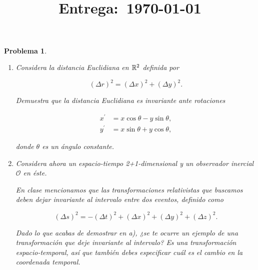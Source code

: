 \documentclass[12pt]{article}
\title{
    \textbf{\homeworknumber}\\
    \normalsize\vspace{0.1in}\small{\textbf{Entrega}:~\today}
    \vspace{-1.5in}
}
\author{}
\date{}
\theoremstyle{break}
\newtheorem{exercise}{Problema}
\theoremstyle{nonumberbreak}
\newcommand*{\observer}{\mathcal{O}}
\begin{document}
    \maketitle
    \thispagestyle{fancy}
    
    \begin{exercise}
        \begin{enumerate}[label = \alph*)]
            \item Considera la distancia Euclidiana en \(\vecspace{R}[2]\) definida por
            
                \begin{equation*}
                    (\Delta r)^{2} = (\Delta x)^{2} + (\Delta y)^{2}.
                \end{equation*}

                Demuestra que la distancia Euclidiana es invariante ante rotaciones

                \begin{align*}
                    x^{\prime} &= x\cos\theta - y\sin\theta,\\
                    y^{\prime} &= x\sin\theta + y\cos\theta,
                \end{align*}

                donde \(\theta\) es un ángulo constante.

            \item Considera ahora un espacio-tiempo 2+1-dimensional y un observador inercial \(\observer\) en éste.
            
                En clase mencionamos que las transformaciones relativistas que buscamos deben dejar invariante al intervalo entre dos eventos, definido como

                \begin{equation*}
                    (\Delta s)^{2} = -(\Delta t)^{2} + (\Delta x)^{2} + (\Delta y)^{2} + (\Delta z)^{2}.
                \end{equation*}

                Dado lo que acabas de demostrar en a), ¿se te ocurre un ejemplo de una transformación que deje invariante al intervalo? Es una transformación espacio-temporal, así que también debes especificar cuál es el cambio en la coordenada temporal.
        \end{enumerate}
    \end{exercise}
\end{document}
